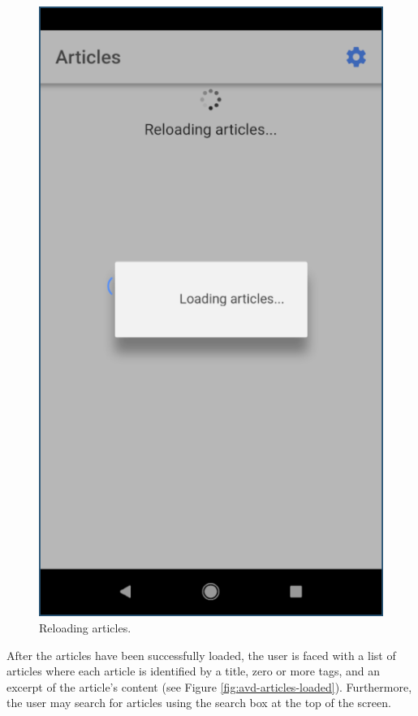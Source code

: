 \documentclass[12pt]{report}
\begin{document}
\begin{figure}
    \centering
    \includegraphics[scale=0.5]{images/avd-articles-loading.png}
    \caption{Reloading articles.}
    \label{fig:avd-articles-loading}
\end{figure}

After the articles have been successfully loaded, the user is faced with a list
of articles where each article is identified by a title, zero or more tags, and
an excerpt of the article's content (see Figure \ref{fig:avd-articles-loaded}).
Furthermore, the user may search for articles using the search box at the top of
the screen.
\end{document}
